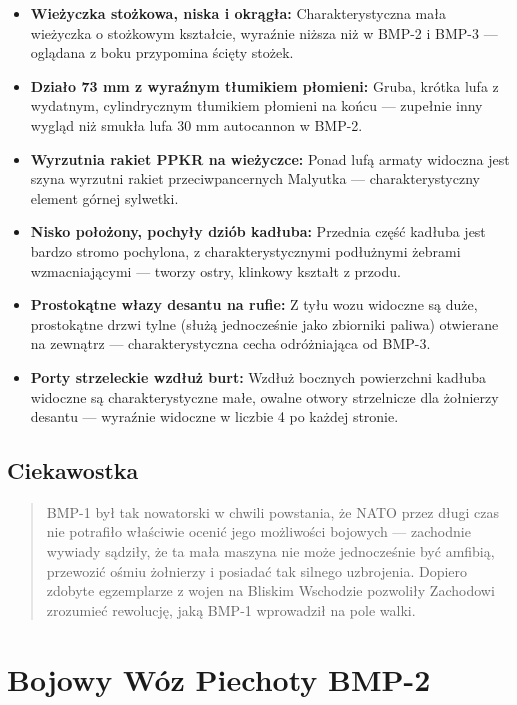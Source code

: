 \documentclass[12pt,oneside]{book}
\providecommand{\tightlist}{%
  \setlength{\itemsep}{0pt}\setlength{\parskip}{0pt}}
\begin{document}
\begin{itemize}
\tightlist
\item
  \textbf{Wieżyczka stożkowa, niska i okrągła:} Charakterystyczna mała
  wieżyczka o stożkowym kształcie, wyraźnie niższa niż w BMP-2 i BMP-3
  --- oglądana z boku przypomina ścięty stożek.
\item
  \textbf{Działo 73 mm z wyraźnym tłumikiem płomieni:} Gruba, krótka
  lufa z wydatnym, cylindrycznym tłumikiem płomieni na końcu ---
  zupełnie inny wygląd niż smukła lufa 30 mm autocannon w BMP-2.
\item
  \textbf{Wyrzutnia rakiet PPKR na wieżyczce:} Ponad lufą armaty
  widoczna jest szyna wyrzutni rakiet przeciwpancernych Malyutka ---
  charakterystyczny element górnej sylwetki.
\item
  \textbf{Nisko położony, pochyły dziób kadłuba:} Przednia część kadłuba
  jest bardzo stromo pochylona, z charakterystycznymi podłużnymi żebrami
  wzmacniającymi --- tworzy ostry, klinkowy kształt z przodu.
\item
  \textbf{Prostokątne włazy desantu na rufie:} Z tyłu wozu widoczne są
  duże, prostokątne drzwi tylne (służą jednocześnie jako zbiorniki
  paliwa) otwierane na zewnątrz --- charakterystyczna cecha odróżniająca
  od BMP-3.
\item
  \textbf{Porty strzeleckie wzdłuż burt:} Wzdłuż bocznych powierzchni
  kadłuba widoczne są charakterystyczne małe, owalne otwory strzelnicze
  dla żołnierzy desantu --- wyraźnie widoczne w liczbie 4 po każdej
  stronie.
\end{itemize}

\subsection{Ciekawostka}\label{ciekawostka-11}

\begin{quote}
BMP-1 był tak nowatorski w chwili powstania, że NATO przez długi czas
nie potrafiło właściwie ocenić jego możliwości bojowych --- zachodnie
wywiady sądziły, że ta mała maszyna nie może jednocześnie być amfibią,
przewozić ośmiu żołnierzy i posiadać tak silnego uzbrojenia. Dopiero
zdobyte egzemplarze z wojen na Bliskim Wschodzie pozwoliły Zachodowi
zrozumieć rewolucję, jaką BMP-1 wprowadził na pole walki.
\end{quote}

\section{Bojowy Wóz Piechoty BMP-2}\label{bojowy-wuxf3z-piechoty-bmp-2}
\end{document}
